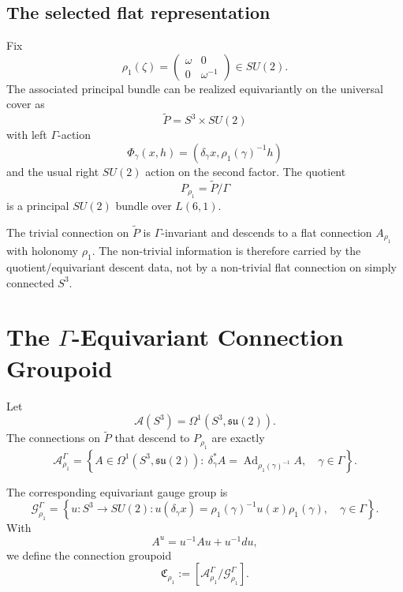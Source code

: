 \documentclass[11pt,a4paper]{article}
\begin{document}
\subsection{The selected flat representation}

Fix
\begin{equation}
\rho_1(\zeta)=
\begin{pmatrix}
\omega&0\\
0&\omega^{-1}
\end{pmatrix}\in SU(2).
\end{equation}
The associated principal bundle can be realized equivariantly on the universal cover as
\begin{equation}
\widetilde P=S^3\times SU(2)
\end{equation}
with left $\Gamma$-action
\begin{equation}
\Phi_\gamma(x,h)
=
\left(\delta_\gamma x,\rho_1(\gamma)^{-1}h\right)
\end{equation}
and the usual right $SU(2)$ action on the second factor. The quotient
\begin{equation}
\boxed{
P_{\rho_1}=\widetilde P/\Gamma
}
\end{equation}
is a principal $SU(2)$ bundle over $L(6,1)$.

The trivial connection on $\widetilde P$ is $\Gamma$-invariant and descends to a flat connection $A_{\rho_1}$ with holonomy $\rho_1$. The non-trivial information is therefore carried by the quotient/equivariant descent data, not by a non-trivial flat connection on simply connected $S^3$.

\section{\texorpdfstring{The $\Gamma$-Equivariant Connection Groupoid}{The Gamma-Equivariant Connection Groupoid}}

Let
\begin{equation}
\mathcal A(S^3)=\Omega^1(S^3,\mathfrak{su}(2)).
\end{equation}
The connections on $\widetilde P$ that descend to $P_{\rho_1}$ are exactly
\begin{equation}
\boxed{
\mathcal A_{\rho_1}^{\Gamma}
=
\left\{
A\in\Omega^1(S^3,\mathfrak{su}(2)):\
\delta_\gamma^*A
=
\operatorname{Ad}_{\rho_1(\gamma)^{-1}}A,
\quad \gamma\in\Gamma
\right\}.
}
\end{equation}

The corresponding equivariant gauge group is
\begin{equation}
\boxed{
\mathcal G_{\rho_1}^{\Gamma}
=
\left\{
 u:S^3\to SU(2):
 u(\delta_\gamma x)
=
\rho_1(\gamma)^{-1}u(x)\rho_1(\gamma),
\quad \gamma\in\Gamma
\right\}.
}
\end{equation}
With
\begin{equation}
A^u=u^{-1}Au+u^{-1}du,
\end{equation}
we define the connection groupoid
\begin{equation}
\boxed{
\mathfrak C_{\rho_1}
:=
\left[\mathcal A_{\rho_1}^{\Gamma}/\mathcal G_{\rho_1}^{\Gamma}\right].
}
\end{equation}
\end{document}
